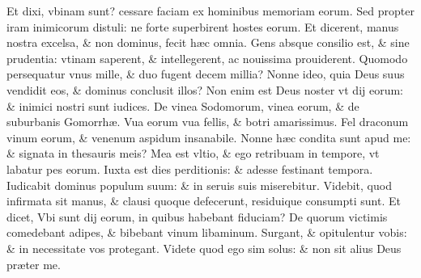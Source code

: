 \documentclass[a5paper,10pt]{book}
\def\ae{æ}
\begin{document}
\begin{multicols*}{2}
\newline \color{red} E\color{black}t dixi, vbinam sunt? cessare faciam ex hominibus memoriam eorum.%
\newline \color{red} S\color{black}ed propter iram inimicorum distuli: ne forte superbirent hostes eorum.
\newline \color{red} E\color{black}t dicerent, manus nostra excelsa, \& non dominus, fecit h\ae c omnia.
\newline \color{red} G\color{black}ens absque consilio est, \& sine prudentia: vtinam saperent, \& intellegerent, ac nouissima prouiderent.
\newline \color{red} Q\color{black}uomodo persequatur vnus mille, \& duo fugent decem millia?
\newline \color{red} N\color{black}onne ideo, quia Deus suus vendidit eos, \& dominus conclusit illos?
\newline \color{red} N\color{black}on enim est Deus noster vt dij eorum: \& inimici nostri sunt iudices.
\newline \color{red} D\color{black}e vinea Sodomorum, vinea eorum, \& de suburbanis Gomorrh\ae .
\newline \color{red} V\color{black}ua eorum vua fellis, \& botri amarissimus.%
\newline \color{red} F\color{black}el draconum vinum eorum, \& venenum aspidum insanabile.
\newline \color{red} N\color{black}onne h\ae c condita sunt apud me: \& signata in thesauris meis?
\newline \color{red} M\color{black}ea est vltio, \& ego retribuam in tempore, vt labatur pes eorum.
\newline \color{red} I\color{black}uxta est dies perditionis: \& adesse festinant tempora.
\newline \color{red} I\color{black}udicabit dominus populum suum: \& in seruis suis miserebitur.
\newline \color{red} V\color{black}idebit, quod infirmata sit manus, \& clausi quoque defecerunt, residuique consumpti sunt.
\newline \color{red} E\color{black}t dicet, Vbi sunt dij eorum, in quibus habebant fiduciam?
\newline \color{red} D\color{black}e quorum victimis comedebant adipes, \& bibebant vinum libaminum.
\newline \color{red} S\color{black}urgant, \& opitulentur vobis: \& in necessitate vos protegant.
\newline \color{red} V\color{black}idete quod ego sim solus: \& non sit alius Deus pr\ae ter me.

\end{multicols*}
\end{document}
